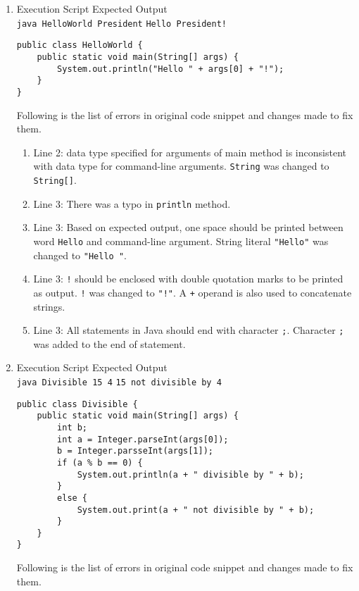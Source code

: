 \begin{enumerate}[label=\textbf{(\alph*)}]
\item Execution Script \hfill Expected Output\\
\texttt{java HelloWorld President} \hfill \texttt{Hello President!}
\begin{lstlisting}
public class HelloWorld {
	public static void main(String[] args) {
		System.out.println("Hello " + args[0] + "!");
	}
}
\end{lstlisting}

Following is the list of errors in original code snippet and changes made to fix them.

\begin{enumerate}[label=\arabic*.]
\item Line 2: data type specified for arguments of main method is inconsistent with data type for command-line arguments. \texttt{String} was changed to \texttt{String[]}.
\item Line 3: There was a typo in \texttt{println} method.
\item Line 3: Based on expected output, one space should be printed between word \texttt{Hello} and command-line argument. String literal \texttt{"Hello"} was changed to \texttt{"Hello "}.
\item Line 3: \texttt{!} should be enclosed with double quotation marks to be printed as output. \texttt{!} was changed to \texttt{"!"}. A \texttt{+} operand is also used to concatenate strings.
\item Line 3: All statements in Java should end with character \texttt{;}. Character \texttt{;} was added to the end of statement.
\end{enumerate}

\item Execution Script \hfill Expected Output\\
\texttt{java Divisible 15 4} \hfill \texttt{15 not divisible by 4}

\begin{lstlisting}
public class Divisible {
	public static void main(String[] args) {
		int b;
		int a = Integer.parseInt(args[0]);
		b = Integer.parsseInt(args[1]);
		if (a % b == 0) {
			System.out.println(a + " divisible by " + b);
		}
		else {
			System.out.print(a + " not divisible by " + b);
		}
	}
}
\end{lstlisting}

Following is the list of errors in original code snippet and changes made to fix them.


\end{enumerate}

